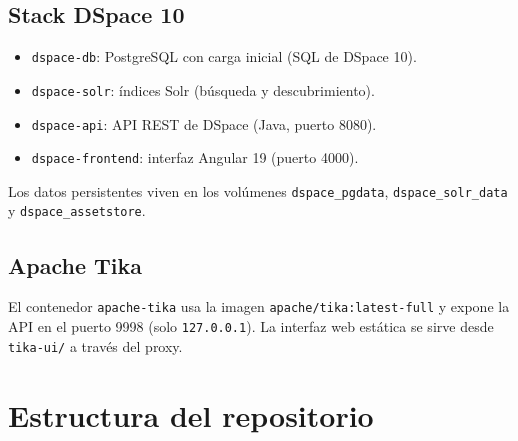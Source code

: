 \documentclass[12pt,a4paper]{report}
\begin{document}
\section{Stack DSpace 10}

\begin{itemize}
  \item \texttt{dspace-db}: PostgreSQL con carga inicial (SQL de DSpace 10).
  \item \texttt{dspace-solr}: índices Solr (búsqueda y descubrimiento).
  \item \texttt{dspace-api}: API REST de DSpace (Java, puerto 8080).
  \item \texttt{dspace-frontend}: interfaz Angular 19 (puerto 4000).
\end{itemize}

Los datos persistentes viven en los volúmenes \texttt{dspace\_pgdata},
\texttt{dspace\_solr\_data} y \texttt{dspace\_assetstore}.

\section{Apache Tika}

El contenedor \texttt{apache-tika} usa la imagen \texttt{apache/tika:latest-full}
y expone la API en el puerto 9998 (solo \texttt{127.0.0.1}). La interfaz web
estática se sirve desde \texttt{tika-ui/} a través del proxy.

\chapter{Estructura del repositorio}
\end{document}
